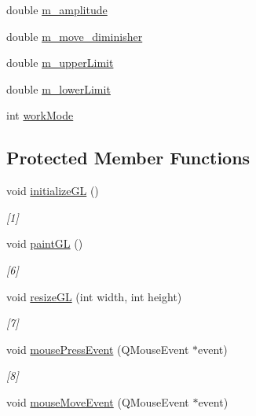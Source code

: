 \begin{DoxyCompactItemize}
\item 
double \hyperlink{class_diffusion_painter_a7a6623d01ae04592e1aca9d07120d0be}{m\+\_\+amplitude}
\item 
double \hyperlink{class_diffusion_painter_a242c4d131a57f225a9065328f8983e31}{m\+\_\+move\+\_\+diminisher}
\item 
double \hyperlink{class_diffusion_painter_acd61d99ea11dfc944dd587e06aee12f3}{m\+\_\+upper\+Limit}
\item 
double \hyperlink{class_diffusion_painter_a4403369545b46ea79445e7fd71d85616}{m\+\_\+lower\+Limit}
\item 
int \hyperlink{class_diffusion_painter_a30867ab87333582db17ae21e586adc36}{work\+Mode}
\end{DoxyCompactItemize}
\subsection*{Protected Member Functions}
\begin{DoxyCompactItemize}
\item 
void \hyperlink{class_diffusion_painter_a55b1412158c32feaa3449225ab440f61}{initialize\+G\+L} ()
\begin{DoxyCompactList}\small\item\em \mbox{[}1\mbox{]} \end{DoxyCompactList}\item 
void \hyperlink{class_diffusion_painter_a4b876a03a2175a83fdbc5d01cc09adb5}{paint\+G\+L} ()
\begin{DoxyCompactList}\small\item\em \mbox{[}6\mbox{]} \end{DoxyCompactList}\item 
void \hyperlink{class_diffusion_painter_a0d1b9ab8c76b65993e58aae112c05d26}{resize\+G\+L} (int width, int height)
\begin{DoxyCompactList}\small\item\em \mbox{[}7\mbox{]} \end{DoxyCompactList}\item 
void \hyperlink{class_diffusion_painter_aa9ba23c0677c1322a10b7e408790ecca}{mouse\+Press\+Event} (Q\+Mouse\+Event $\ast$event)
\begin{DoxyCompactList}\small\item\em \mbox{[}8\mbox{]} \end{DoxyCompactList}\item 
void \hyperlink{class_diffusion_painter_afc66b6fca1954ad337c7a7b312c48b02}{mouse\+Move\+Event} (Q\+Mouse\+Event $\ast$event)
\end{DoxyCompactItemize}


